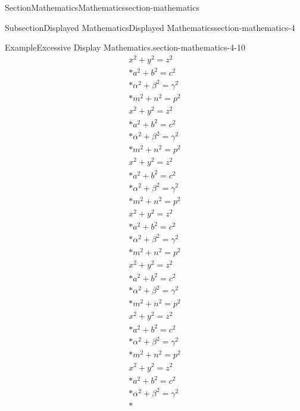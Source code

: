 \documentclass[twoside,10pt,]{article}
\numberwithin{equation}{section}
\begin{document}
\begin{sectionptx}{Section}{Mathematics}{}{Mathematics}{}{}{section-mathematics}
\begin{subsectionptx}{Subsection}{Displayed Mathematics}{}{Displayed Mathematics}{}{}{section-mathematics-4}
\begin{example}{Example}{Excessive Display Mathematics.}{section-mathematics-4-10}
\begin{gather}
x^2+y^2=z^2\label{section-mathematics-4-10-3-2-9}\\*
a^2+b^2=c^2\label{section-mathematics-4-10-3-2-10}\\*
\alpha^2+\beta^2=\gamma^2\label{section-mathematics-4-10-3-2-11}\\*
m^2+n^2=p^2\label{section-mathematics-4-10-3-2-12}\\
x^2+y^2=z^2\label{section-mathematics-4-10-3-2-13}\\*
a^2+b^2=c^2\label{section-mathematics-4-10-3-2-14}\\*
\alpha^2+\beta^2=\gamma^2\label{section-mathematics-4-10-3-2-15}\\*
m^2+n^2=p^2\label{section-mathematics-4-10-3-2-16}\\
x^2+y^2=z^2\label{section-mathematics-4-10-3-2-17}\\*
a^2+b^2=c^2\label{section-mathematics-4-10-3-2-18}\\*
\alpha^2+\beta^2=\gamma^2\label{section-mathematics-4-10-3-2-19}\\*
m^2+n^2=p^2\label{section-mathematics-4-10-3-2-20}\\
x^2+y^2=z^2\label{section-mathematics-4-10-3-2-21}\\*
a^2+b^2=c^2\label{section-mathematics-4-10-3-2-22}\\*
\alpha^2+\beta^2=\gamma^2\label{section-mathematics-4-10-3-2-23}\\*
m^2+n^2=p^2\label{section-mathematics-4-10-3-2-24}\\
x^2+y^2=z^2\label{section-mathematics-4-10-3-2-25}\\*
a^2+b^2=c^2\label{section-mathematics-4-10-3-2-26}\\*
\alpha^2+\beta^2=\gamma^2\label{section-mathematics-4-10-3-2-27}\\*
m^2+n^2=p^2\label{section-mathematics-4-10-3-2-28}\\
x^2+y^2=z^2\label{section-mathematics-4-10-3-2-29}\\*
a^2+b^2=c^2\label{section-mathematics-4-10-3-2-30}\\*
\alpha^2+\beta^2=\gamma^2\label{section-mathematics-4-10-3-2-31}\\*
m^2+n^2=p^2\label{section-mathematics-4-10-3-2-32}\\
x^2+y^2=z^2\label{section-mathematics-4-10-3-2-33}\\*
a^2+b^2=c^2\label{section-mathematics-4-10-3-2-34}\\*
\alpha^2+\beta^2=\gamma^2\label{section-mathematics-4-10-3-2-35}\\*

\end{gather}
\end{example}
\end{subsectionptx}
\end{sectionptx}
\end{document}
